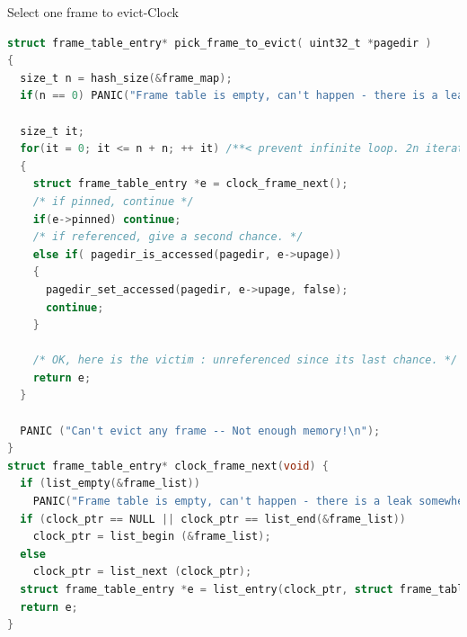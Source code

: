 \documentclass[10pt]{beamer}
\begin{document}
\begin{frame}[fragile]{Select one frame to evict-Clock}
\begin{lstlisting}[language=C]
struct frame_table_entry* pick_frame_to_evict( uint32_t *pagedir )
{
  size_t n = hash_size(&frame_map);
  if(n == 0) PANIC("Frame table is empty, can't happen - there is a leak somewhere");

  size_t it;
  for(it = 0; it <= n + n; ++ it) /**< prevent infinite loop. 2n iterations is enough. */
  {
    struct frame_table_entry *e = clock_frame_next();
    /* if pinned, continue */
    if(e->pinned) continue;
    /* if referenced, give a second chance. */
    else if( pagedir_is_accessed(pagedir, e->upage)) 
    {
      pagedir_set_accessed(pagedir, e->upage, false);
      continue;
    }

    /* OK, here is the victim : unreferenced since its last chance. */
    return e;
  }

  PANIC ("Can't evict any frame -- Not enough memory!\n");
}
struct frame_table_entry* clock_frame_next(void) {
  if (list_empty(&frame_list))
    PANIC("Frame table is empty, can't happen - there is a leak somewhere");
  if (clock_ptr == NULL || clock_ptr == list_end(&frame_list))
    clock_ptr = list_begin (&frame_list);
  else
    clock_ptr = list_next (clock_ptr);
  struct frame_table_entry *e = list_entry(clock_ptr, struct frame_table_entry, lelem);
  return e;
}
\end{lstlisting}
\end{frame}
\end{document}
